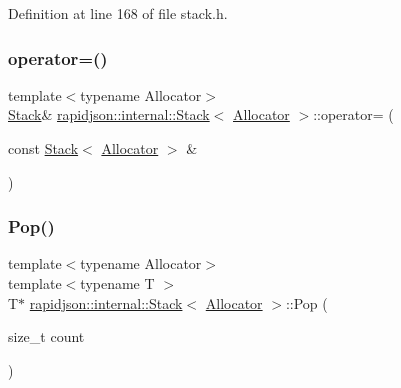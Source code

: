 Definition at line 168 of file stack.\+h.


\begin{DoxyCode}{0}

\end{DoxyCode}
\mbox{\label{classrapidjson_1_1internal_1_1_stack_a7d0b83798d0c29b50103841fe61ba7d9}} 
\subsubsection{\texorpdfstring{operator=()}{operator=()}}
{\footnotesize\ttfamily template$<$typename Allocator$>$ \\
\mbox{\hyperlink{classrapidjson_1_1internal_1_1_stack}{Stack}}\& \mbox{\hyperlink{classrapidjson_1_1internal_1_1_stack}{rapidjson\+::internal\+::\+Stack}}$<$ \mbox{\hyperlink{classrapidjson_1_1_allocator}{Allocator}} $>$\+::operator= (\begin{DoxyParamCaption}\item[{const \mbox{\hyperlink{classrapidjson_1_1internal_1_1_stack}{Stack}}$<$ \mbox{\hyperlink{classrapidjson_1_1_allocator}{Allocator}} $>$ \&}]{ }\end{DoxyParamCaption})\hspace{0.3cm}{\ttfamily [private]}}

\mbox{\label{classrapidjson_1_1internal_1_1_stack_a58f510acbf1548de4127233905b82449}} 
\subsubsection{\texorpdfstring{Pop()}{Pop()}}
{\footnotesize\ttfamily template$<$typename Allocator$>$ \\
template$<$typename T $>$ \\
T$\ast$ \mbox{\hyperlink{classrapidjson_1_1internal_1_1_stack}{rapidjson\+::internal\+::\+Stack}}$<$ \mbox{\hyperlink{classrapidjson_1_1_allocator}{Allocator}} $>$\+::Pop (\begin{DoxyParamCaption}\item[{size\+\_\+t}]{count }\end{DoxyParamCaption})}




